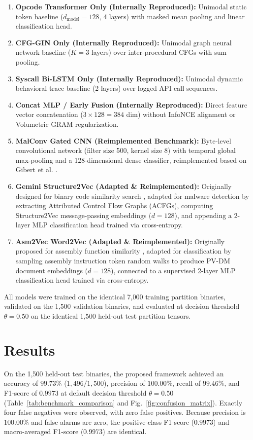 \documentclass[pdflatex,sn-mathphys-num]{sn-jnl}
\begin{document}
\begin{enumerate}
    \item \textbf{Opcode Transformer Only (Internally Reproduced):} Unimodal static token baseline ($d_{\text{model}} = 128$, 4 layers) with masked mean pooling and linear classification head.
    \item \textbf{CFG-GIN Only (Internally Reproduced):} Unimodal graph neural network baseline ($K = 3$ layers) over inter-procedural CFGs with sum pooling.
    \item \textbf{Syscall Bi-LSTM Only (Internally Reproduced):} Unimodal dynamic behavioral trace baseline (2 layers) over logged API call sequences.
    \item \textbf{Concat MLP / Early Fusion (Internally Reproduced):} Direct feature vector concatenation ($3 \times 128 = 384$ dim) without InfoNCE alignment or Volumetric GRAM regularization.
    \item \textbf{MalConv Gated CNN (Reimplemented Benchmark):} Byte-level convolutional network (filter size 500, kernel size 8) with temporal global max-pooling and a 128-dimensional dense classifier, reimplemented based on Gibert et al. \cite{Gibert2020}.
    \item \textbf{Gemini Structure2Vec (Adapted \& Reimplemented):} Originally designed for binary code similarity search \cite{Kim2023Revisiting}, adapted for malware detection by extracting Attributed Control Flow Graphs (ACFGs), computing Structure2Vec message-passing embeddings ($d = 128$), and appending a 2-layer MLP classification head trained via cross-entropy.
    \item \textbf{Asm2Vec Word2Vec (Adapted \& Reimplemented):} Originally proposed for assembly function similarity \cite{BinCola2024}, adapted for classification by sampling assembly instruction token random walks to produce PV-DM document embeddings ($d = 128$), connected to a supervised 2-layer MLP classification head trained via cross-entropy.
\end{enumerate}
All models were trained on the identical 7,000 training partition binaries, validated on the 1,500 validation binaries, and evaluated at decision threshold $\theta = 0.50$ on the identical 1,500 held-out test partition tensors.

\section{Results}\label{sec:results}
On the 1,500 held-out test binaries, the proposed framework achieved an accuracy of $99.73\%$ ($1,496/1,500$), precision of $100.00\%$, recall of $99.46\%$, and F1-score of $0.9973$ at default decision threshold $\theta = 0.50$ (Table~\ref{tab:benchmark_comparison} and Fig.~\ref{fig:confusion_matrix}). Exactly four false negatives were observed, with zero false positives. Because precision is $100.00\%$ and false alarms are zero, the positive-class F1-score ($0.9973$) and macro-averaged F1-score ($0.9973$) are identical.
\end{document}
